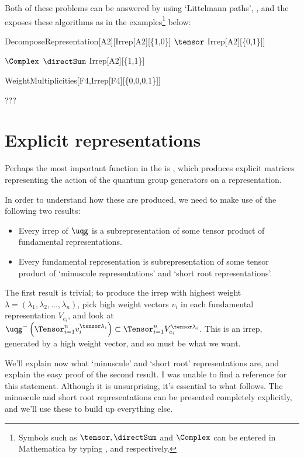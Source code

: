 Both of these problems can be answered by using `Littelmann paths',
\cite{???}, and the \pkg exposes these algorithms
as in the examples\footnote{Symbols such as $\tensor, \directSum$ and
$\Complex$ can be entered in Mathematica by typing ,
 and  respectively.} below:
\begin{mma}
\begin{inm}
DecomposeRepresentation[A2][Irrep[A2][\{1,0\}] $\tensor$
Irrep[A2][\{0,1\}]]
\end{inm}
\begin{outm}
$\Complex$ $\directSum$ Irrep[A2][\{1,1\}]
\end{outm}
\begin{inm}
WeightMultiplicities[F4,Irrep[F4][\{0,0,0,1\}]]
\end{inm}
\begin{outm}
???
\end{outm}
\end{mma}

\section{Explicit representations}
Perhaps the most important function in the \pkg is
, which produces explicit matrices representing
the action of the quantum group generators on a representation.

In order to understand how these are produced, we need to make use of the
following two results:

\begin{itemize}
\item Every irrep of $\uqg$ is a subrepresentation of some tensor product
of fundamental representations.
\item Every fundamental representation is subrepresentation of some
tensor product of `minuscule representations' and `short root
representations'.
\end{itemize}

The first result is trivial; to produce the irrep with highest weight
$\lambda = (\lambda_1, \lambda_2, \ldots, \lambda_n)$, pick high weight
vectors $v_i$ in each fundamental representation $V_{e_i}$, and look at
$\uqg^-\left(\Tensor_{i=1}^n  v_i^{\tensor \lambda_i}\right) \subset
\Tensor_{i=1}^n  V_{e_i}^{\tensor \lambda_i}$. This is an irrep,
generated by a high weight vector, and so must be what we want.

We'll explain now what `minuscule' and `short root' representations are,
and explain the easy proof of the second result. I was unable to find a
reference for this statement. Although it is unsurprising, it's essential
to what follows. The minuscule and short root representations can be
presented completely explicitly, and we'll use these to build up
everything else.

